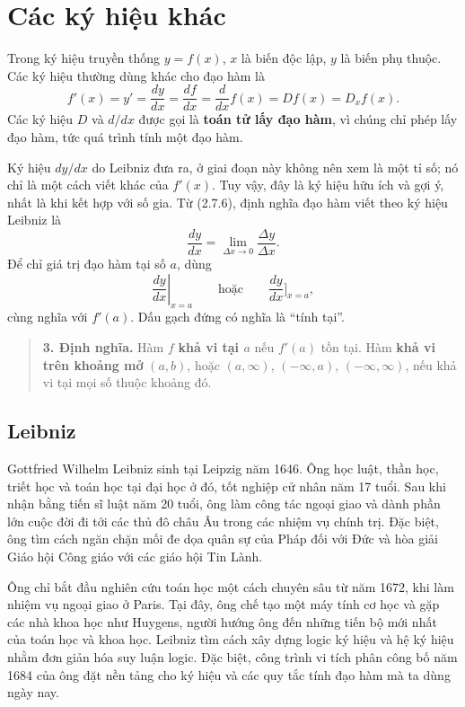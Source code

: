 \documentclass[12pt,a4paper]{article}
\begin{document}
\section*{Các ký hiệu khác}
Trong ký hiệu truyền thống $y=f(x)$, $x$ là biến độc lập, $y$ là biến phụ thuộc. Các ký hiệu thường dùng khác cho đạo hàm là
\[f'(x)=y'=\frac{dy}{dx}=\frac{df}{dx}=\frac{d}{dx}f(x)=Df(x)=D_xf(x).\]
Các ký hiệu $D$ và $d/dx$ được gọi là \textbf{toán tử lấy đạo hàm}, vì chúng chỉ phép lấy đạo hàm, tức quá trình tính một đạo hàm.

Ký hiệu $dy/dx$ do Leibniz đưa ra, ở giai đoạn này không nên xem là một tỉ số; nó chỉ là một cách viết khác của $f'(x)$. Tuy vậy, đây là ký hiệu hữu ích và gợi ý, nhất là khi kết hợp với số gia. Từ (2.7.6), định nghĩa đạo hàm viết theo ký hiệu Leibniz là
\[\frac{dy}{dx}=\lim_{\Delta x\to0}\frac{\Delta y}{\Delta x}.\]
Để chỉ giá trị đạo hàm tại số $a$, dùng
\[\left.\frac{dy}{dx}\right|_{x=a}\qquad\text{hoặc}\qquad\frac{dy}{dx}\bigg]_{x=a},\]
cùng nghĩa với $f'(a)$. Dấu gạch đứng có nghĩa là “tính tại”.
\begin{samepage}\begin{quote}\textbf{3. Định nghĩa.} Hàm $f$ \textbf{khả vi tại $a$} nếu $f'(a)$ tồn tại. Hàm \textbf{khả vi trên khoảng mở} $(a,b)$, hoặc $(a,\infty)$, $(-\infty,a)$, $(-\infty,\infty)$, nếu khả vi tại mọi số thuộc khoảng đó.
\end{quote}\end{samepage}
\subsection*{Leibniz}
Gottfried Wilhelm Leibniz sinh tại Leipzig năm 1646. Ông học luật, thần học, triết học và toán học tại đại học ở đó, tốt nghiệp cử nhân năm 17 tuổi. Sau khi nhận bằng tiến sĩ luật năm 20 tuổi, ông làm công tác ngoại giao và dành phần lớn cuộc đời đi tới các thủ đô châu Âu trong các nhiệm vụ chính trị. Đặc biệt, ông tìm cách ngăn chặn mối đe dọa quân sự của Pháp đối với Đức và hòa giải Giáo hội Công giáo với các giáo hội Tin Lành.

Ông chỉ bắt đầu nghiên cứu toán học một cách chuyên sâu từ năm 1672, khi làm nhiệm vụ ngoại giao ở Paris. Tại đây, ông chế tạo một máy tính cơ học và gặp các nhà khoa học như Huygens, người hướng ông đến những tiến bộ mới nhất của toán học và khoa học. Leibniz tìm cách xây dựng logic ký hiệu và hệ ký hiệu nhằm đơn giản hóa suy luận logic. Đặc biệt, công trình vi tích phân công bố năm 1684 của ông đặt nền tảng cho ký hiệu và các quy tắc tính đạo hàm mà ta dùng ngày nay.
\end{document}
